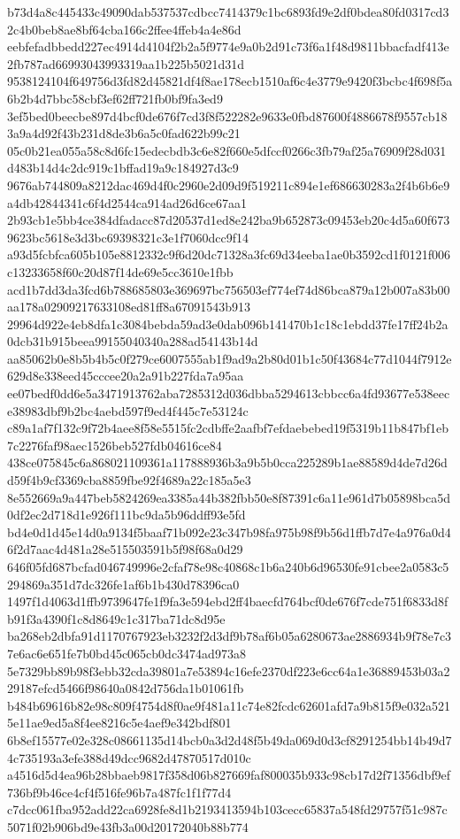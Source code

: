\documentclass[11pt,a4paper]{article}
\begin{document}
{b73d4a8c445433c49090dab537537cdbcc7414379c1bc6893fd9e2df0bdea80fd0317cd32c4b0beb8ae8bf64cba166c2ffee4ffeb4a4e86d
eebfefadbbedd227ec4914d4104f2b2a5f9774e9a0b2d91c73f6a1f48d9811bbacfadf413e2fb787ad66993043993319aa1b225b5021d31d
9538124104f649756d3fd82d45821df4f8ae178ecb1510af6c4e3779e9420f3bcbc4f698f5a6b2b4d7bbc58cbf3ef62ff721fb0bf9fa3ed9
3ef5bed0beecbe897d4bcf0de676f7cd3f8f522282e9633e0fbd87600f4886678f9557cb183a9a4d92f43b231d8de3b6a5c0fad622b99c21
05c0b21ea055a58c8d6fc15edecbdb3c6e82f660e5dfccf0266c3fb79af25a76909f28d031d483b14d4c2dc919c1bffad19a9c184927d3c9
9676ab744809a8212dac469d4f0c2960e2d09d9f519211c894e1ef686630283a2f4b6b6e9a4db42844341c6f4d2544ca914ad26d6ce67aa1
2b93cb1e5bb4ce384dfadacc87d20537d1ed8e242ba9b652873c09453eb20c4d5a60f6739623bc5618e3d3bc69398321c3e1f7060dcc9f14
a93d5fcbfca605b105e8812332c9f6d20dc71328a3fc69d34eeba1ae0b3592cd1f0121f006c13233658f60c20d87f14de69e5cc3610e1fbb
acd1b7dd3da3fcd6b788685803e369697bc756503ef774ef74d86bca879a12b007a83b00aa178a02909217633108ed81ff8a67091543b913
29964d922e4eb8dfa1c3084bebda59ad3e0dab096b141470b1c18c1ebdd37fe17ff24b2a0dcb31b915beea99155040340a288ad54143b14d
aa85062b0e8b5b4b5c0f279ce6007555ab1f9ad9a2b80d01b1c50f43684c77d1044f7912e629d8e338eed45cccee20a2a91b227fda7a95aa
ee07bedf0dd6e5a3471913762aba7285312d036dbba5294613cbbcc6a4fd93677e538eece38983dbf9b2bc4aebd597f9ed4f445c7e53124c
c89a1af7f132c9f72b4aee8f58e5515fc2cdbffe2aafbf7efdaebebed19f5319b11b847bf1eb7c2276faf98aec1526beb527fdb04616ce84
438ce075845c6a868021109361a117888936b3a9b5b0cca225289b1ae88589d4de7d26dd59f4b9cf3369cba8859fbe92f4689a22c185a5e3
8e552669a9a447beb5824269ea3385a44b382fbb50e8f87391c6a11e961d7b05898bca5d0df2ec2d718d1e926f111bc9da5b96ddff93e5fd
bd4e0d1d45e14d0a9134f5baaf71b092e23c347b98fa975b98f9b56d1ffb7d7e4a976a0d46f2d7aac4d481a28e515503591b5f98f68a0d29
646f05fd687bcfad046749996e2cfaf78e98c40868c1b6a240b6d96530fe91cbee2a0583c5294869a351d7dc326fe1af6b1b430d78396ca0
1497f1d4063d1ffb9739647fe1f9fa3e594ebd2ff4baecfd764bcf0de676f7cde751f6833d8fb91f3a4390f1c8d8649c1c317ba71dc8d95e
ba268eb2dbfa91d1170767923eb3232f2d3df9b78af6b05a6280673ae2886934b9f78e7c37e6ac6e651fe7b0bd45c065cb0dc3474ad973a8
5e7329bb89b98f3ebb32cda39801a7e53894c16efe2370df223e6cc64a1e36889453b03a229187efcd5466f98640a0842d756da1b01061fb
b484b69616b82e98c809f4754d8f0ae9f481a11c74e82fcdc62601afd7a9b815f9e032a5215e11ae9ed5a8f4ee8216c5e4aef9e342bdf801
6b8ef15577e02e328c08661135d14bcb0a3d2d48f5b49da069d0d3cf8291254bb14b49d74c735193a3efe388d49dcc9682d47870517d010c
a4516d5d4ea96b28bbaeb9817f358d06b827669faf800035b933c98cb17d2f71356dbf9ef736bf9b46ce4cf4f516fe96b7a487fc1f1f77d4
c7dcc061fba952add22ca6928fe8d1b2193413594b103cecc65837a548fd29757f51c987c5071f02b906bd9e43fb3a00d20172040b88b774
}
\end{document}

